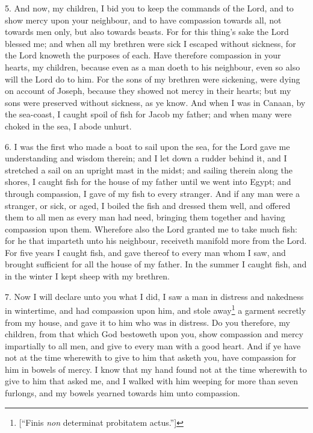 5. And now, my children, I bid you to keep the commands of the Lord, and to show mercy upon your neighbour, and to have compassion towards all, not towards men only, but also towards beasts. For for this thing’s sake the Lord blessed me; and when all my brethren were sick I escaped without sickness, for the Lord knoweth the purposes of each. Have therefore compassion in your hearts, my children, because even as a man doeth to his neighbour, even so also will the Lord do to him. For the sons of my brethren were sickening, were dying on account of Joseph, because they showed not mercy in their hearts; but my sons were preserved without sickness, as ye know. And when I was in Canaan, by the sea-coast, I caught spoil of fish for Jacob my father; and when many were choked in the sea, I abode unhurt.

6. I was the first who made a boat to sail upon the sea, for the Lord gave me understanding and wisdom therein; and I let down a rudder behind it, and I stretched a sail on an upright mast in the midst; and sailing therein along the shores, I caught fish for the house of my father until we went into Egypt; and through compassion, I gave of my fish to every stranger. And if any man were a stranger, or sick, or aged, I boiled the fish and dressed them well, and offered them to all men as every man had need, bringing them together and having compassion upon them. Wherefore also the Lord granted me to take much fish: for he that imparteth unto his neighbour, receiveth manifold more from the Lord. For five years I caught fish, and gave thereof to every man whom I saw, and brought sufficient for all the house of my father. In the summer I caught fish, and in the winter I kept sheep with my brethren.

7. Now I will declare unto you what I did, I saw a man in distress and nakedness in wintertime, and had compassion upon him, and stole away\footnote{[“Finis \emph{non} determinat probitatem actus.”]} a garment secretly from my house, and gave it to him who was in distress. Do you therefore, my children, from that which God bestoweth upon you, show compassion and mercy impartially to all men, and give to every man with a good heart. And if ye have not at the time wherewith to give to him that asketh you, have compassion for him in bowels of mercy. I know that my hand found not at the time wherewith to give to him that asked me, and I walked with him weeping for more than seven furlongs, and my bowels yearned towards him unto compassion.

